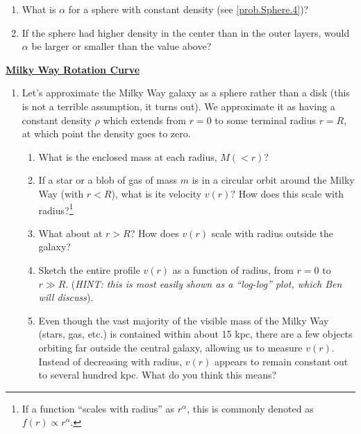 \documentclass[11pt]{article}
\renewcommand{\section}[1]{\textbf{\underline{#1}}}
\begin{document}
\begin{enumerate}[resume]
\begin{enumerate}
\item
  \label{prob.limits.1}
  What is $\alpha$ for a sphere with constant density (see
  \ref{prob.Sphere.4})?

\item
  \label{prob.limits.2}
  If the sphere had higher density in the center than in the outer
  layers, would $\alpha$ be larger or smaller than the value above?
\end{enumerate}
\end{enumerate}

\section{Milky Way Rotation Curve}

\begin{enumerate}[resume]

\item
  \label{prob.MW}
  Let's approximate the Milky Way galaxy as a sphere rather than a
  disk (this is not a terrible assumption, it turns out). We
  approximate it as having a constant density $\rho$ which extends from
  $r=0$ to some terminal radius $r=R$, at which point the density goes
  to zero.
  \begin{enumerate}
  \item
  \label{prob.MW.1}
    What is the enclosed mass at each radius, $M(<r)$?
  \item
  \label{prob.MW.2}
    If a star or a blob of gas of mass $m$ is in a circular orbit
    around the Milky Way (with $r < R$), what is its velocity $v(r)$?
    How does this scale with radius?\footnote{If a function ``scales
      with radius'' as $r^\alpha$, this is commonly denoted as $f(r)
      \propto r^\alpha$.}
  \item
    \label{prob.MW.3}
    What about at $r > R$? How does $v(r)$ scale with radius outside
    the galaxy?
  \item
    \label{prob.MW.4}
    Sketch the entire profile $v(r)$ as a function of
    radius, from $r=0$ to $r \gg R$. (\textit{HINT: this is most
      easily shown as a ``log-log'' plot, which Ben will discuss}).
  \item
    \label{prob.MW.5}
    Even though the vast majority of the visible mass of the Milky Way
    (stars, gas, etc.) is contained within about 15 kpc, there are a
    few objects orbiting far outside the central galaxy, allowing us
    to measure $v(r)$. Instead of decreasing with radius, $v(r)$
    appears to remain constant out to several hundred kpc. What do you
    think this means? 
  \end{enumerate}

\end{enumerate}
\end{document}
